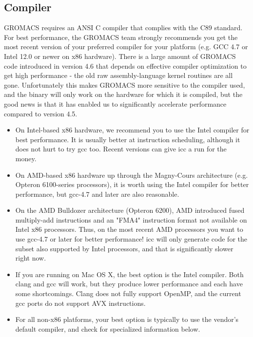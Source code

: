 \documentclass{article}[12pt,a4paper,twoside]
\newcommand{\gromacs}{GROMACS}
\begin{document}
\subsection{Compiler}

\gromacs{} requires an ANSI C compiler that complies with the C89
standard. For best performance, the \gromacs{} team strongly
recommends you get the most recent version of your preferred compiler
for your platform (e.g. GCC 4.7 or Intel 12.0 or newer on x86
hardware). There is a large amount of \gromacs{} code introduced in
version 4.6 that depends on effective compiler optimization to get
high performance - the old raw assembly-language kernel routines are all gone.
Unfortunately this makes \gromacs{} more sensitive to the compiler
used, and the binary will only work on the hardware for which it is compiled,
but the good news is that it has enabled us to significantly accelerate performance
compared to version 4.5. 

\begin{itemize}
\item On Intel-based x86 hardware, we recommend you to use
the Intel compiler for best performance. It is usually better at instruction
scheduling, although it does not hurt to try gcc too. Recent versions can
give icc a run for the money.
\item On AMD-based x86 hardware up through the Magny-Cours architecture
(e.g. Opteron 6100-series processors), it is worth using the Intel compiler for
better performance, but gcc-4.7 and later are also reasonable.
\item On the AMD Bulldozer architecture (Opteron 6200), AMD introduced fused multiply-add
instructions and an "FMA4" instruction format not available on Intel x86 processors. Thus,
on the most recent AMD processors you want to use gcc-4.7 or later for better performance!
icc will only generate code for the subset also supported by Intel processors, and that
is significantly slower right now.
\item If you are running on Mac OS X, the best option is the Intel compiler.
Both clang and gcc will work, but they produce lower performance and each have some
shortcomings. Clang does not fully support OpenMP, and the current gcc ports do not
support AVX instructions. 
\item For all non-x86 platforms, your best option is typically to use the vendor's 
default compiler, and check for specialized information below.
\end{itemize}
\end{document}
